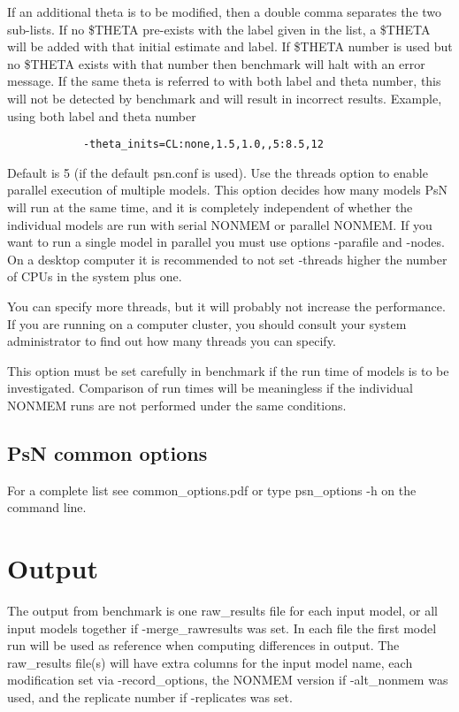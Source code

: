 \begin{optionlist}
			If an additional theta is to be modified, then a double comma separates 
			the two sub-lists. If no \$THETA pre-exists with the label given in the list,
			a \$THETA will be added with that initial estimate and label. 
			If \$THETA number is used but no \$THETA exists with that number then benchmark will halt with an
			error message.
			If the same theta is referred to with both label and theta number, this will not be detected
			by benchmark and will result in incorrect results.
			Example, using both label and theta number
			\begin{verbatim}
			-theta_inits=CL:none,1.5,1.0,,5:8.5,12
			\end{verbatim}
			\nextopt
			Default is 5 (if the default psn.conf is used). Use the threads option to enable parallel execution of multiple models. This option decides how many models PsN will run at the same time, and it is completely independent of whether the individual models are run with serial NONMEM or parallel NONMEM. If you want to run a single model in parallel you must use options -parafile and -nodes. On a desktop computer it is recommended to not set -threads higher the number of CPUs in the system plus one. 
			
			You can specify more threads, but it will probably not increase the performance. If you are running on a computer cluster, you should consult your system administrator to find out how many threads you can specify.
			
			This option must be set carefully in benchmark if the run time of models is to be investigated. Comparison of run times will be meaningless if the individual NONMEM runs are not performed under the same conditions. 
			\nextopt
						\end{optionlist}

\subsection{PsN common options}
For a complete list see common\_options.pdf or type psn\_options -h on the command line.

\section{Output}
The output from benchmark is
one raw\_results file for each input model, or all input models together if -merge\_rawresults was set.
In each file the first model run will be used as reference when computing differences in output.
The raw\_results file(s) will have extra columns for the input model name, each
modification set via -record\_options, the NONMEM version if -alt\_nonmem was used, and the replicate
number if -replicates was set.


